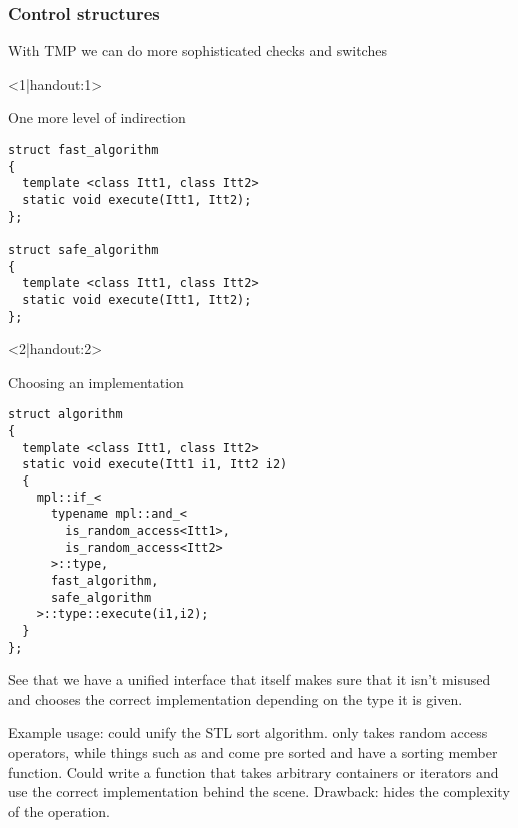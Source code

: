\documentclass[11pt,a4paper,dvipsnames,usenames]{beamer}
\begin{document}
\begin{frame}[fragile]
  \frametitle{Control structures}

  \vfill

  With TMP we can do more sophisticated checks and switches

  \vfill

  \begin{onlyenv}<1|handout:1>
  \begin{exampleblock}{One more level of indirection}
  \begin{lstlisting}
struct fast_algorithm
{
  template <class Itt1, class Itt2>
  static void execute(Itt1, Itt2);
};

struct safe_algorithm
{
  template <class Itt1, class Itt2>
  static void execute(Itt1, Itt2);
};
  \end{lstlisting}
  \end{exampleblock}
  \end{onlyenv}

  \begin{onlyenv}<2|handout:2>
  \begin{exampleblock}{Choosing an implementation}
  \begin{lstlisting}
struct algorithm
{
  template <class Itt1, class Itt2>
  static void execute(Itt1 i1, Itt2 i2)
  {
    mpl::if_<
      typename mpl::and_<
        is_random_access<Itt1>,
        is_random_access<Itt2>
      >::type,
      fast_algorithm,
      safe_algorithm
    >::type::execute(i1,i2);
  }
};
  \end{lstlisting}
  \end{exampleblock}
  \end{onlyenv}

  {
    See that we have a unified interface that itself makes sure that it isn't misused and chooses the correct implementation
    depending on the type it is given.

    \vspace{1em}

    Example usage: could unify the STL sort algorithm.  only takes random access operators, while things such
    as  and  come pre sorted and  have a sorting member function. Could
    write a function that takes arbitrary containers or iterators and use the correct implementation behind the scene. Drawback:
    hides the complexity of the operation.
  }

  \vfill

\end{frame}
\end{document}
